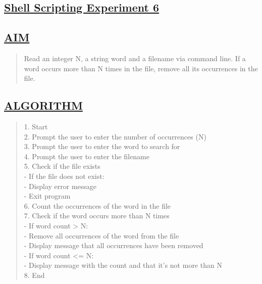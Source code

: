 \documentclass[a4paper, 12pt]{article}
\begin{document}
\newpage
\begin{center}
\section*{\LARGE \textbf{\underline{Shell Scripting Experiment 6}}} %
\end{center}

\subsection*{\underline{AIM}}
\begin{quote}
Read an integer N, a string word and a filename via command line. If a word occurs more
than N times in the file, remove all its occurrences in the file.

\end{quote}

\subsection*{\underline{ALGORITHM}}
\begin{quote}
1. Start\\
2. Prompt the user to enter the number of occurrences (N)\\
3. Prompt the user to enter the word to search for\\
4. Prompt the user to enter the filename\\
5. Check if the file exists\\
   - If the file does not exist:\\
     - Display error message\\
     - Exit program\\
6. Count the occurrences of the word in the file\\
7. Check if the word occurs more than N times\\
   - If word count > N:\\
     - Remove all occurrences of the word from the file\\
     - Display message that all occurrences have been removed\\
   - If word count <= N:\\
     - Display message with the count and that it's not more than N\\
8. End\\
\end{quote}
\end{document}
